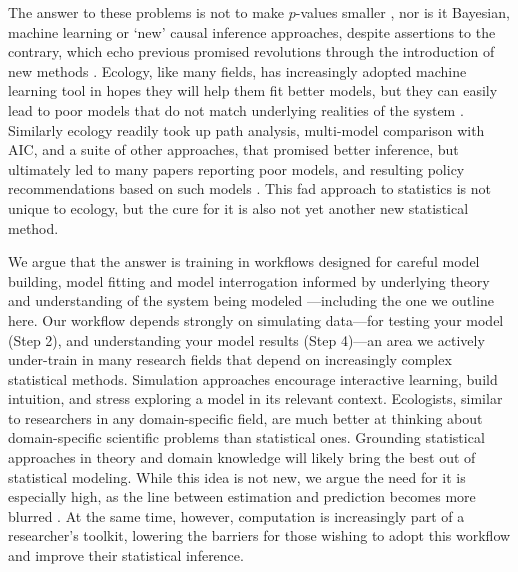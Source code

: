\documentclass[11pt]{article}
\begin{document}
The answer to these problems is not to make $p$-values smaller \citep{halsey2015,colquhoun2017}, nor is it Bayesian, machine learning or `new' causal inference approaches, despite assertions to the contrary, which echo previous promised revolutions through the introduction of new methods \citep[e.g.,][]{mitchell1992testing,Burnham2004,byrnes2025causal}. %
Ecology, like many fields, has increasingly adopted machine learning tool in hopes they will help them fit better models, but they can easily lead to poor models that do not match underlying realities of the system \citep{efron2020prediction,pichler2023machine}. Similarly ecology readily took up path analysis, multi-model comparison with AIC, and a suite of other approaches, that promised better inference, but ultimately led to many papers reporting poor models, and resulting policy recommendations based on such models \citep{petraitis1996inferring,leroux2019prevalence}. This fad approach to statistics is not unique to ecology, but the cure for it is also not yet another new statistical method.

We argue that the answer is training in workflows designed for careful model building, model fitting and model interrogation informed by underlying theory and understanding of the system being modeled \citep{betanworkflow,gelman2020bayesian,vandeschoot2021}---including the one we outline here. Our workflow depends strongly on simulating data---for testing your model (Step 2), and understanding your model results (Step 4)---an area we actively under-train in many research fields that depend on increasingly complex statistical methods. Simulation approaches encourage interactive learning, build intuition, and stress exploring a model in its relevant context. Ecologists, similar to researchers in any domain-specific field, are much better at thinking about domain-specific scientific problems than statistical ones. Grounding statistical approaches in theory and domain knowledge will likely bring the best out of statistical modeling. While this idea is not new, we argue the need for it is especially high, as the line between estimation and prediction becomes more blurred \citep{shmueli2010explain}. At the same time, however, computation is increasingly part of a researcher's toolkit, lowering the barriers for those wishing to adopt this workflow and improve their statistical inference. 
\end{document}
